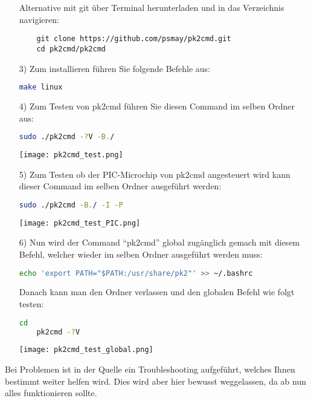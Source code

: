 \begin{itemize}
    Alternative mit git über Terminal herunterladen und in das Verzeichnis navigieren:
    \begin{lstlisting}
    git clone https://github.com/psmay/pk2cmd.git
    cd pk2cmd/pk2cmd
    \end{lstlisting}
    \item[3)] Zum installieren führen Sie folgende Befehle aus:
    \begin{lstlisting}[language=bash]
    make linux
    \end{lstlisting}
    \item[4)] Zum Testen von pk2cmd führen Sie diesen Command im selben Ordner aus:
    \begin{lstlisting}[language=bash]
    sudo ./pk2cmd -?V -B./
    \end{lstlisting}
    \begin{center}
        \texttt{[image: pk2cmd\_test.png]}
    \end{center}
    \newpage
    \item[5)] Zum Testen ob der PIC-Microchip von {\ttfamily pk2cmd} angesteuert wird kann dieser Command im selben Ordner ausgeführt werden:
    \begin{lstlisting}[language=bash]
    sudo ./pk2cmd -B./ -I -P
    \end{lstlisting}
    \begin{center}
        \texttt{[image: pk2cmd\_test\_PIC.png]}
    \end{center}
    \item[6)] Nun wird der Command \enquote{pk2cmd} global zugänglich gemach mit diesem Befehl, welcher wieder im selben Ordner ausgeführt werden muss:
    \begin{lstlisting}[language=bash]
    echo 'export PATH="$PATH:/usr/share/pk2"' >> ~/.bashrc
    \end{lstlisting}
    Danach kann man den Ordner verlassen und den globalen Befehl wie folgt testen:
    \begin{lstlisting}[language=bash]
    cd
    pk2cmd -?V
    \end{lstlisting}
    \begin{center}
       \texttt{[image: pk2cmd\_test\_global.png]}
    \end{center}
\end{itemize}
Bei Problemen ist in der Quelle ein Troubleshooting aufgeführt, welches Ihnen bestimmt weiter helfen wird. Dies wird aber hier bewusst weggelassen, da ab nun alles funktionieren sollte.
\newpage
